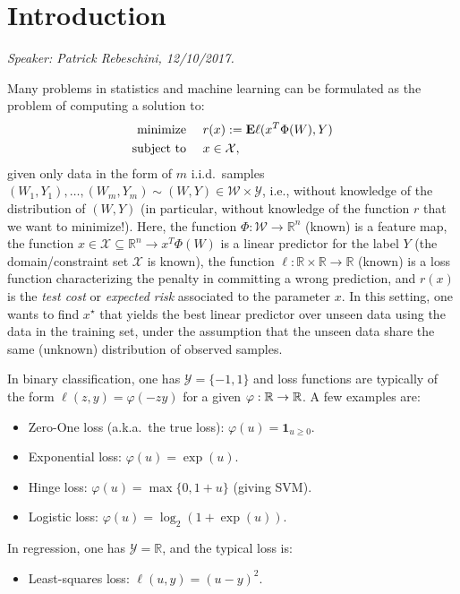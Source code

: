 
\section{Introduction}\label{sec:intro}
\emph{Speaker: Patrick Rebeschini, 12/10/2017.}\\

\label{sec:introduction}

Many problems in statistics and machine learning can be formulated as the problem of computing a solution to:
\begin{align}
	\begin{aligned}
		\text{minimize }\quad   & r(x) := \mathbf{E}\ell(x^T\Phi(W),Y)\\
		\text{subject to }\quad & x\in \mathcal{X},
	\end{aligned}
	\label{def:mainproblem}
\end{align}
given only data in the form of $m$ i.i.d.\ samples $(W_1,Y_1),\ldots,(W_m,Y_m) \sim (W,Y) \in \mathcal{W}\times\mathcal{Y}$, i.e., without knowledge of the distribution of $(W,Y)$ (in particular, without knowledge of the function $r$ that we want to minimize!). Here, the function $\Phi:\mathcal{W}\rightarrow\mathbb{R}^n$ (known) is a feature map, the function $x \in \mathcal{X}\subseteq\mathbb{R}^n \rightarrow x^T\Phi(W)$ is a linear predictor for the label $Y$ (the domain/constraint set $\mathcal{X}$ is known), the function $\ell:\mathbb{R}\times \mathbb{R} \rightarrow \mathbb{R}$ (known) is a loss function characterizing the penalty in committing a wrong prediction, and $r(x)$ is the \emph{test cost}  or \emph{expected risk} associated to the parameter $x$. In this setting, one wants to find $x^\star$ that yields the best linear predictor over unseen data using the data in the training set, under the assumption that the unseen data share the same (unknown) distribution of observed samples.

In binary classification, one has $\mathcal{Y}=\{-1,1\}$ and loss functions are typically of the form $\ell(z,y) = \varphi(-zy)$ for a given $\varphi:\mathbb{R}\rightarrow\mathbb{R}$. A few examples are:
\begin{itemize}
\item Zero-One loss (a.k.a.\ the true loss): $\varphi(u) = \mathbf{1}_{u\ge 0}$.
\item Exponential loss: $\varphi(u) = \exp(u)$.
\item Hinge loss: $\varphi(u) = \max\{0,1+u\}$ (giving SVM).
\item Logistic loss: $\varphi(u) = \log_2(1+\exp(u))$.
\end{itemize}
In regression, one has $\mathcal{Y}=\mathbb{R}$, and the typical loss is:
\begin{itemize}
\item Least-squares loss: $\ell(u,y) = (u-y)^2$.
\end{itemize}


